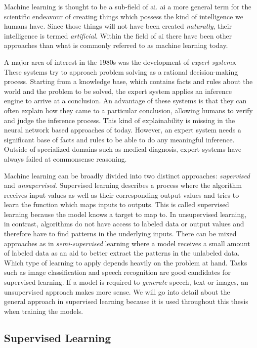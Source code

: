 \documentclass[draft,final]{vutinfth} %
\begin{document}
Machine learning is thought to be a sub-field of \gls{ai}. \gls{ai} a
more general term for the scientific endeavour of creating things
which possess the kind of intelligence we humans have. Since those
things will not have been created \emph{naturally}, their intelligence
is termed \emph{artificial}. Within the field of \gls{ai} there have
been other approaches than what is commonly referred to as machine
learning today.

A major area of interest in the 1980s was the development of
\emph{expert systems}. These systems try to approach problem solving
as a rational decision-making process. Starting from a knowledge base,
which contains facts and rules about the world and the problem to be
solved, the expert system applies an inference engine to arrive at a
conclusion. An advantage of these systems is that they can often
explain how they came to a particular conclusion, allowing humans to
verify and judge the inference process. This kind of explainability is
missing in the neural network based approaches of today. However, an
expert system needs a significant base of facts and rules to be able
to do any meaningful inference. Outside of specialized domains such as
medical diagnosis, expert systems have always failed at commonsense
reasoning.

Machine learning can be broadly divided into two distinct approaches:
\emph{supervised} and \emph{unsupervised}. Supervised learning
describes a process where the algorithm receives input values as well
as their corresponding output values and tries to learn the function
which maps inputs to outputs. This is called supervised learning
because the model knows a target to map to. In unsupervised learning,
in contrast, algorithms do not have access to labeled data or output
values and therefore have to find patterns in the underlying
inputs. There can be mixed approaches as in \emph{semi-supervised}
learning where a model receives a small amount of labeled data as an
aid to better extract the patterns in the unlabeled data. Which type
of learning to apply depends heavily on the problem at hand. Tasks
such as image classification and speech recognition are good
candidates for supervised learning. If a model is required to
\emph{generate} speech, text or images, an unsupervised approach makes
more sense. We will go into detail about the general approach in
supervised learning because it is used throughout this thesis when
training the models.

\subsection{Supervised Learning}
\label{ssec:theory-sl}
\end{document}
